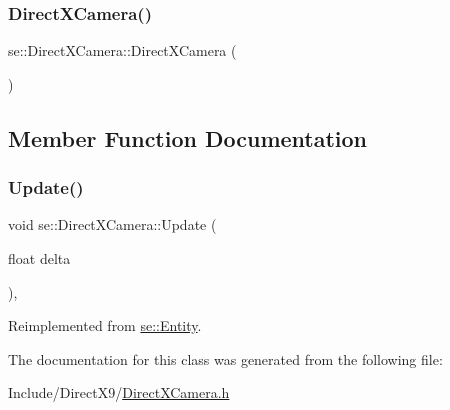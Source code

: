 \subsubsection{\texorpdfstring{Direct\+X\+Camera()}{DirectXCamera()}}
{\footnotesize\ttfamily se\+::\+Direct\+X\+Camera\+::\+Direct\+X\+Camera (\begin{DoxyParamCaption}{ }\end{DoxyParamCaption})}



\subsection{Member Function Documentation}
\mbox{\label{classse_1_1_direct_x_camera_ae313a5d5a4d2c1b88e5f40285b31b921}} 
\subsubsection{\texorpdfstring{Update()}{Update()}}
{\footnotesize\ttfamily void se\+::\+Direct\+X\+Camera\+::\+Update (\begin{DoxyParamCaption}\item[{float}]{delta }\end{DoxyParamCaption})\hspace{0.3cm}{\ttfamily [override]}, {\ttfamily [virtual]}}



Reimplemented from \mbox{\hyperlink{classse_1_1_entity_a1cd277c4c5a517f5cde8b72d5c40a8f0}{se\+::\+Entity}}.



The documentation for this class was generated from the following file\+:\begin{DoxyCompactItemize}
\item 
Include/\+Direct\+X9/\mbox{\hyperlink{_direct_x_camera_8h}{Direct\+X\+Camera.\+h}}\end{DoxyCompactItemize}
